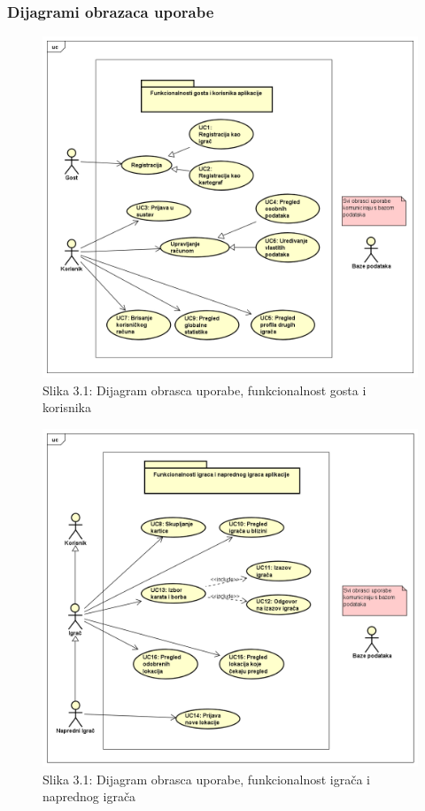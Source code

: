 					
				\subsubsection{Dijagrami obrazaca uporabe}
				
				\begin{figure}[H]
        			\includegraphics[scale=0.5]{slike/UCDiagrami/korisnik.png} %
        			\centering
        			\caption{Slika 3.1: Dijagram obrasca uporabe, funkcionalnost gosta i korisnika}
        			\label{fig:promjene}
        		\end{figure}
					
				\begin{figure}[H]
        			\includegraphics[scale=0.5]{slike/UCDiagrami/igrac.png} %
        			\centering
        			\caption{Slika 3.1: Dijagram obrasca uporabe, funkcionalnost igrača i naprednog igrača}
        			\label{fig:promjene}
        		\end{figure}
					

